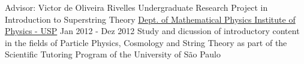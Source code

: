 \begin{cventries}
\cventry
{Advisor: Victor de Oliveira Rivelles}
{Undergraduate Research Project in Introduction to Superstring Theory}
{\href{https://portal.if.usp.br/fma/en}{Dept. of Mathematical Physics \newline Institute of Physics - USP}} %
{Jan 2012 - Dez 2012}
{Study and dicussion of introductory content in the fields of Particle Physics, Cosmology and String Theory as part of the Scientific Tutoring Program of the University of São Paulo}


\end{cventries}